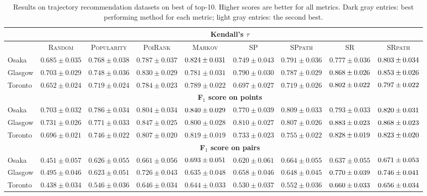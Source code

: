 \begin{table*}[t]
{%
\begin{tabular}{l|cc|ccc|ccc} \hline
& \multicolumn{8}{c}{\bf Kendall's $\tau$} \\ \hline
 & \textsc{Random} & \textsc{Popularity} & \textsc{PoiRank} & \textsc{Markov} & \textsc{SP} & \textsc{SPpath} & \textsc{SR} & \textsc{SRpath} \\ \hline
Osaka & $0.685\pm0.035$ & $0.768\pm0.038$ & $0.787\pm0.037$ & $\firstBest{0.824\pm0.031}$ & $0.749\pm0.043$ & $0.791\pm0.036$ & $0.777\pm0.036$ & $\secondBest{0.803\pm0.034}$ \\
Glasgow & $0.703\pm0.029$ & $0.748\pm0.036$ & $0.830\pm0.029$ & $0.781\pm0.031$ & $0.790\pm0.030$ & $0.787\pm0.029$ & $\firstBest{0.868\pm0.026}$ & $\secondBest{0.853\pm0.026}$ \\
Toronto & $0.652\pm0.024$ & $0.719\pm0.024$ & $0.784\pm0.023$ & $0.789\pm0.022$ & $0.697\pm0.027$ & $0.719\pm0.026$ & $\firstBest{0.802\pm0.022}$ & $\secondBest{0.797\pm0.022}$ \\
\hline
& \multicolumn{8}{c}{\bf F$_1$ score on points} \\ \hline
Osaka & $0.703\pm0.032$ & $0.786\pm0.034$ & $0.804\pm0.034$ & $\firstBest{0.840\pm0.029}$ & $0.770\pm0.039$ & $0.809\pm0.033$ & $0.793\pm0.033$ & $\secondBest{0.820\pm0.031}$ \\
Glasgow & $0.731\pm0.026$ & $0.771\pm0.033$ & $0.847\pm0.025$ & $0.800\pm0.028$ & $0.810\pm0.027$ & $0.807\pm0.026$ & $\firstBest{0.883\pm0.023}$ & $\secondBest{0.868\pm0.023}$ \\
Toronto & $0.696\pm0.021$ & $0.746\pm0.022$ & $0.807\pm0.020$ & $0.819\pm0.019$ & $0.733\pm0.023$ & $0.755\pm0.022$ & $\firstBest{0.828\pm0.019}$ & $\secondBest{0.823\pm0.020}$ \\
\hline
& \multicolumn{8}{c}{\bf F$_1$ score on pairs} \\ \hline
Osaka & $0.451\pm0.057$ & $0.626\pm0.055$ & $0.661\pm0.056$ & $\firstBest{0.693\pm0.051}$ & $0.620\pm0.061$ & $0.664\pm0.055$ & $0.637\pm0.055$ & $\secondBest{0.671\pm0.053}$ \\
Glasgow & $0.495\pm0.046$ & $0.623\pm0.051$ & $0.726\pm0.043$ & $0.635\pm0.048$ & $0.658\pm0.046$ & $0.648\pm0.045$ & $\firstBest{0.770\pm0.039}$ & $\secondBest{0.746\pm0.041}$ \\
Toronto & $0.438\pm0.034$ & $0.546\pm0.036$ & $0.646\pm0.034$ & $0.644\pm0.033$ & $0.530\pm0.037$ & $0.552\pm0.036$ & $\firstBest{0.660\pm0.033}$ & $\secondBest{0.656\pm0.034}$ \\
\hline
\end{tabular}
}
\caption{Results on trajectory recommendation datasets on best of top-10.
Higher scores are better for all metrics. 
Dark gray entries: \colorbox{gray!62}{best} performing method for each metric;
light gray entries: the \colorbox{gray!20}{second best}.
}
\label{tab:result}     
\end{table*}
